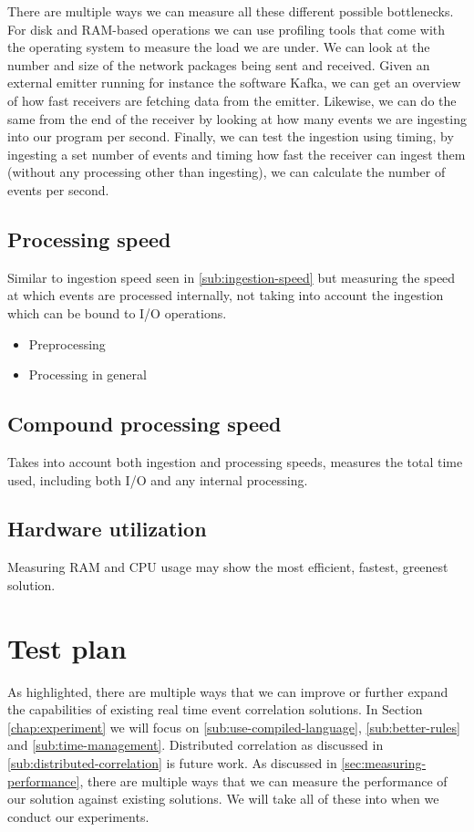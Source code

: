 There are multiple ways we can measure all these different possible bottlenecks. For disk and RAM-based operations we can use profiling tools that come with the operating system to measure the load we are under. We can look at the number and size of the network packages being sent and received. Given an external emitter running for instance the software Kafka, we can get an overview of how fast receivers are fetching data from the emitter. Likewise, we can do the same from the end of the receiver by looking at how many events we are ingesting into our program per second. Finally, we can test the ingestion using timing, by ingesting a set number of events and timing how fast the receiver can ingest them (without any processing other than ingesting), we can calculate the number of events per second.

\subsection{Processing speed}
\label{subs:processing-speed}
Similar to ingestion speed seen in \ref{sub:ingestion-speed} but measuring the speed at which events are processed internally, not taking into account the ingestion which can be bound to I/O operations.

\begin{itemize}
    \item Preprocessing
    \item Processing in general
\end{itemize}

\subsection{Compound processing speed}
\label{sub:compound-processing-speed}
Takes into account both ingestion and processing speeds, measures the total time used, including both I/O and any internal processing.

\subsection{Hardware utilization}
\label{sub:hardware-utilization}
Measuring RAM and CPU usage may show the most efficient, fastest, greenest solution.


\section{Test plan}
As highlighted, there are multiple ways that we can improve or further expand the capabilities of existing real time event correlation solutions. In Section \ref{chap:experiment} we will focus on \ref{sub:use-compiled-language}, \ref{sub:better-rules} and \ref{sub:time-management}. Distributed correlation as discussed in \ref{sub:distributed-correlation} is future work.
As discussed in \ref{sec:measuring-performance}, there are multiple ways that we can measure the performance of our solution against existing solutions. We will take all of these into when we conduct our experiments.
\iffalse

